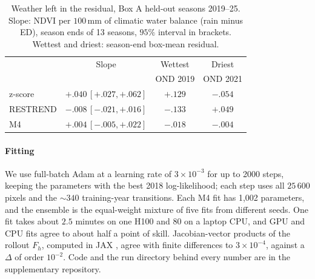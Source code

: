 \documentclass[letterpaper]{article} %
\begin{document}
\begin{table}[t]\centering\footnotesize\setlength{\tabcolsep}{4pt}
\caption{Weather left in the residual, Box A held-out seasons 2019--25. Slope: NDVI per $100$\,mm of climatic water balance (rain minus ED), season ends of 13 seasons, $95\%$ interval in brackets. Wettest and driest: season-end box-mean residual.}\label{tab:bias}
\begin{tabular}{lccc}\toprule
 & Slope & Wettest & Driest\\
 & & OND 2019 & OND 2021\\\midrule
z-score & $+.040$\,{\scriptsize$[+.027,+.062]$} & $+.129$ & $-.054$\\
RESTREND & $-.008$\,{\scriptsize$[-.021,+.016]$} & $-.133$ & $+.049$\\
M4 & $+.004$\,{\scriptsize$[-.005,+.022]$} & $-.018$ & $-.004$\\\bottomrule
\end{tabular}
\end{table}

\paragraph{Fitting} We use full-batch Adam \citep{kingma2015} at a learning rate of $3\times10^{-3}$ for up to 2000 steps, keeping the parameters with the best 2018 log-likelihood; each step uses all $25\,600$ pixels and the $\sim340$ training-year transitions. Each M4 fit has 1,002 parameters, and the ensemble is the equal-weight mixture of five fits from different seeds. One fit takes about $2.5$ minutes on one H100 and $80$ on a laptop CPU, and GPU and CPU fits agree to about half a point of skill. Jacobian-vector products of the rollout $F_h$, computed in JAX \citep{jax2018}, agree with finite differences to $3\times10^{-4}$, against a $\Delta$ of order $10^{-2}$. Code and the run directory behind every number are in the supplementary repository.

\end{document}
